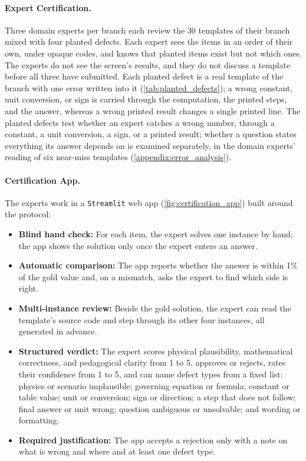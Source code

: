\paragraph{Expert Certification.} Three domain experts per branch each review the 30 templates of
their branch mixed with four planted defects.
Each expert sees the items in an order of their own, under opaque codes, and knows that planted
items exist but not which ones.
The experts do not see the screen's results, and they do not discuss a template before all three
have submitted.
Each planted defect is a real template of the branch with one error written into it
(\autoref{tab:planted_defects}); a wrong constant, unit conversion, or sign is carried through the
computation, the printed steps, and the answer, whereas a wrong printed result changes a single
printed line.
The planted defects test whether an expert catches a wrong number, through a constant, a unit
conversion, a sign, or a printed result; whether a question states everything its answer depends
on is examined separately, in the domain experts' reading of six near-miss templates
(\autoref{appendix:error_analysis}).

\paragraph{Certification App.} The experts work in a \texttt{Streamlit} web app
(\autoref{fig:certification_app}) built around the protocol:
\begin{itemize}[nosep, leftmargin=*]
\item \textbf{Blind hand check:} For each item, the expert solves one instance by hand; the app
shows the solution only once the expert enters an answer.
\item \textbf{Automatic comparison:} The app reports whether the answer is within 1\% of the gold
value and, on a mismatch, asks the expert to find which side is right.
\item \textbf{Multi-instance review:} Beside the gold solution, the expert can read the template's
source code and step through its other four instances, all generated in advance.
\item \textbf{Structured verdict:} The expert scores physical plausibility, mathematical
correctness, and pedagogical clarity from 1 to 5, approves or rejects, rates their confidence
from 1 to 5, and can name defect types from a fixed list: physics or scenario implausible;
governing equation or formula; constant or table value; unit or conversion; sign or direction; a
step that does not follow; final answer or unit wrong; question ambiguous or unsolvable; and
wording or formatting.
\item \textbf{Required justification:} The app accepts a rejection only with a note on what is
wrong and where and at least one defect type.
\end{itemize}

